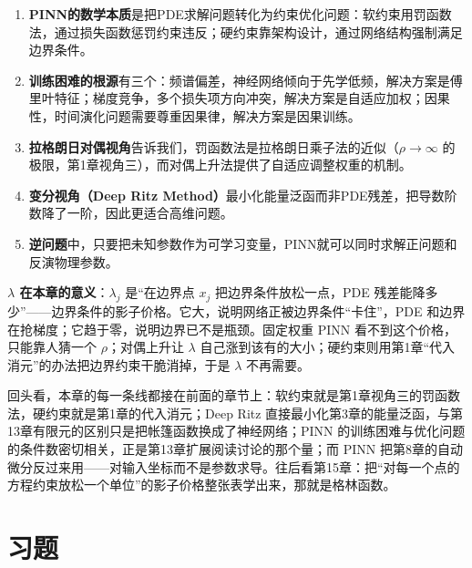 \begin{enumerate}
    \item \textbf{PINN的数学本质}是把PDE求解问题转化为约束优化问题：软约束用罚函数法，通过损失函数惩罚约束违反；硬约束靠架构设计，通过网络结构强制满足边界条件。

    \item \textbf{训练困难的根源}有三个：频谱偏差，神经网络倾向于先学低频，解决方案是傅里叶特征；梯度竞争，多个损失项方向冲突，解决方案是自适应加权；因果性，时间演化问题需要尊重因果律，解决方案是因果训练。

    \item \textbf{拉格朗日对偶视角}告诉我们，罚函数法是拉格朗日乘子法的近似（$\rho \to \infty$ 的极限，第1章视角三），而对偶上升法提供了自适应调整权重的机制。

    \item \textbf{变分视角（Deep Ritz Method）}最小化能量泛函而非PDE残差，把导数阶数降了一阶，因此更适合高维问题。

    \item \textbf{逆问题}中，只要把未知参数作为可学习变量，PINN就可以同时求解正问题和反演物理参数。
\end{enumerate}

\begin{physicalmeaning}
\textbf{$\lambda$ 在本章的意义}：$\lambda_j$ 是“在边界点 $x_j$ 把边界条件放松一点，PDE 残差能降多少”——边界条件的影子价格。它大，说明网络正被边界条件“卡住”，PDE 和边界在抢梯度；它趋于零，说明边界已不是瓶颈。固定权重 PINN 看不到这个价格，只能靠人猜一个 $\rho$；对偶上升让 $\lambda$ 自己涨到该有的大小；硬约束则用第1章“代入消元”的办法把边界约束干脆消掉，于是 $\lambda$ 不再需要。

回头看，本章的每一条线都接在前面的章节上：软约束就是第1章视角三的罚函数法，硬约束就是第1章的代入消元；Deep Ritz 直接最小化第3章的能量泛函，与第13章有限元的区别只是把帐篷函数换成了神经网络；PINN 的训练困难与优化问题的条件数密切相关，正是第13章扩展阅读讨论的那个量；而 PINN 把第8章的自动微分反过来用——对输入坐标而不是参数求导。往后看第15章：把“对每一个点的方程约束放松一个单位”的影子价格整张表学出来，那就是格林函数。
\end{physicalmeaning}

\section{习题}


